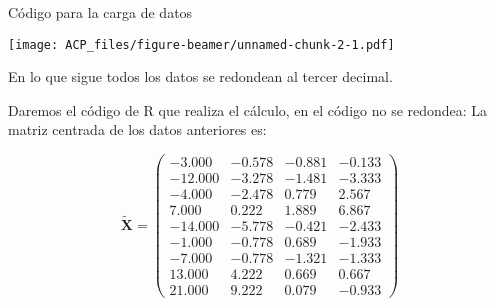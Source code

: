 \documentclass[
  spanish,
  ignorenonframetext,
]{beamer}
\newenvironment{Shaded}{\begin{snugshade}}{\end{snugshade}}
\newcommand{\CharTok}[1]{\textcolor[rgb]{0.31,0.60,0.02}{#1}}
\newcommand{\DataTypeTok}[1]{\textcolor[rgb]{0.13,0.29,0.53}{#1}}
\newcommand{\DecValTok}[1]{\textcolor[rgb]{0.00,0.00,0.81}{#1}}
\newcommand{\KeywordTok}[1]{\textcolor[rgb]{0.13,0.29,0.53}{\textbf{#1}}}
\newcommand{\NormalTok}[1]{#1}
\newcommand{\OperatorTok}[1]{\textcolor[rgb]{0.81,0.36,0.00}{\textbf{#1}}}
\newcommand{\StringTok}[1]{\textcolor[rgb]{0.31,0.60,0.02}{#1}}
\begin{document}
\begin{frame}[fragile]{Código para la carga de datos}
\begin{Shaded}
\end{Shaded}

\texttt{[image: ACP\_files/figure-beamer/unnamed-chunk-2-1.pdf]}

En lo que sigue todos los datos se redondean al tercer decimal.

Daremos el código de R que realiza el cálculo, en el código no se
redondea: La matriz centrada de los datos anteriores es:

\[
\tilde{\mathbf{X}}=
\left(
\begin{array}{rrrr}
-3.000 & -0.578 & -0.881 & -0.133 \\
-12.000 & -3.278 & -1.481 & -3.333 \\
-4.000 & -2.478 & 0.779 & 2.567 \\
7.000 & 0.222 & 1.889 & 6.867 \\
-14.000 & -5.778 & -0.421 & -2.433 \\
-1.000 & -0.778 & 0.689 & -1.933 \\
-7.000 & -0.778 & -1.321 & -1.333 \\
13.000 & 4.222 & 0.669 & 0.667 \\
21.000 & 9.222 & 0.079 & -0.933
\end{array}
\right)
\]
\end{frame}
\end{document}
